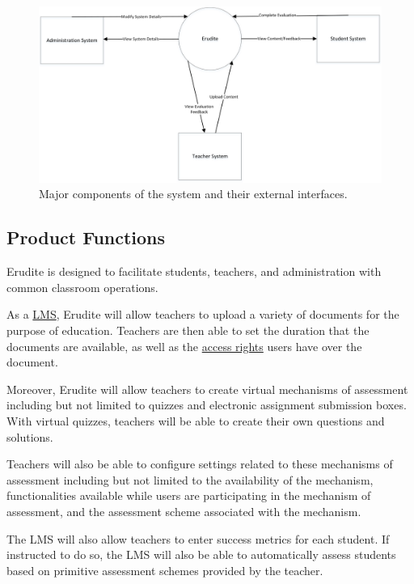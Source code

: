 \documentclass[]{article}
\begin{document}
\begin{figure}[h]
  \centering
  \includegraphics[scale=0.7]{A1_Assets/2-1_Product_Perspective_Diagram_v2.jpg}
  \caption{Major components of the system and their external interfaces.}
\end{figure}



\subsection{Product Functions}
\label{sub:product_functions}
Erudite is designed to facilitate students, teachers, and administration
with common classroom operations.

As a \underline{LMS}, Erudite will allow teachers to upload a variety of
documents for
the purpose of education. Teachers are then able to set the duration that the
documents are available, as well as the \underline{access rights} users
have over the document.

Moreover, Erudite will allow teachers to create virtual mechanisms of
assessment including but not limited to quizzes and electronic assignment
submission boxes. With virtual quizzes, teachers will be able to create their
own questions and solutions.

Teachers will also be able to configure settings related to these mechanisms of
assessment including but not limited to the availability of the mechanism,
functionalities available while users are participating in the mechanism of
assessment, and the assessment scheme associated with the mechanism.

The LMS will also allow teachers to enter success metrics for each student. If
instructed to do so, the LMS will also be able to automatically assess students
based on primitive assessment schemes provided by the teacher.
\end{document}

